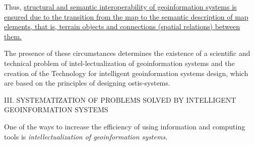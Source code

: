 \documentclass{article}
\begin{document}
\begin{multicols}{2}
Thus, \uline{structural and semantic interoperability of geoinformation systems is ensured due to the transition from the map to the semantic description of map elements, that is, terrain objects and connections (spatial relations) between them.}

The presence of these circumstances determines the existence of a scientific and technical problem of intel-lectualization of geoinformation systems and the creation of the Technology for intelligent geoinformation systems design, which are based on the principles of designing ostis-systems.
\begin{center}
    III. SYSTEMATIZATION OF PROBLEMS SOLVED BY
INTELLIGENT GEOINFORMATION SYSTEMS
\end{center}
One of the ways to increase the efficiency of using
information and computing tools is \textit{intellectualization of geoinformation systems.}


\end{multicols}
\end{document}
